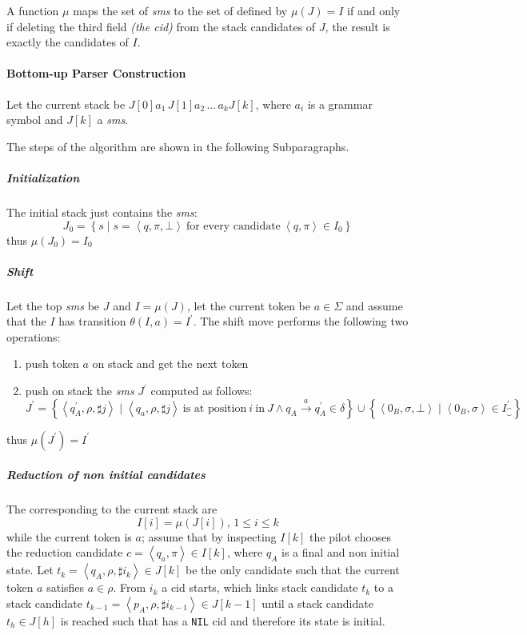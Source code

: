 \documentclass[english]{article}
\begin{document}
A function \(\mu\) maps the set of \textit{sms} to the set of \mstates defined by \(\mu(J) = I\) if and only if deleting the third field \textit{(the cid)} from the stack candidates of \(J\), the result is exactly the candidates of \(I\).

\paragraph{Bottom-up Parser Construction}
\label{par:parser-algorithm-bottom-up}

Let the current stack be \(J[0] a_1 \, J[1] a_2 \, \ldots \, a_k J[k]\), where \(a_i\) is a grammar symbol and \(J[k]\) a \textit{sms}.

The steps of the algorithm are shown in the following Subparagraphs.

\subparagraph*{Initialization}

The initial stack just contains the \textit{sms}:
\[ J_0 = \left\{ s \mid s = \left\langle q, \pi, \bot \right\rangle \ \text{for every candidate} \ \left\langle q, \pi \right\rangle \in I_0 \right\} \]
thus \(\mu(J_0) = I_0\)

\subparagraph*{Shift}

Let the top \textit{sms} be \(J\) and \(I = \mu(J)\), let the current token be \(a \in \Sigma\) and assume that the \mstate \(I\) has transition \(\theta(I, a) = I^\prime\). The shift move performs the following two operations:
\begin{enumerate}[label=\arabic*., ref=(\arabic*)]
  \item\label{enum:shift-move-1} push token \(a\) on stack and get the next token
  \item\label{enum:shift-move-2} push on stack the \textit{sms} \(J^\prime\) computed as follows:
  \[
    J^\prime  =  \left\{ \left\langle q_A^\prime, \rho, \sharp j \right\rangle \mid \left\langle q_a, \rho, \sharp j \right\rangle \ \text{is at position} \ i \ \text{in} \ J \land q_A \xrightarrow{a} q_A^\prime \in \delta \right\}
    \cup         \left\{ \left\langle 0_B, \sigma, \bot \right\rangle \mid \left\langle 0_B, \sigma  \right\rangle \in I_{\closure}^\prime \right\}
  \]
\end{enumerate}
thus \(\mu(J^\prime) = I^\prime\)

\subparagraph*{Reduction of non initial candidates}

The \mstates corresponding to the current stack are
\[ I[i] = \mu\left( J[i] \right), \, 1 \leq i \leq k \]
while the current token is \(a\);
assume that by inspecting \(I[k]\) the pilot chooses the reduction candidate \(c = \left\langle q_a, \pi \right\rangle \in I[k]\), where \(q_A\) is a final and non initial state.
Let \(t_k = \left\langle q_A, \rho, \sharp i_k \right\rangle \in J[k]\) be the only candidate such that the current token \(a\) satisfies \(a \in \rho\).
From \(i_k\) a cid starts, which links stack candidate \(t_k\) to a stack candidate \(t_{k-1} = \left\langle p_A, \rho, \sharp i_{k-1} \right\rangle \in J[k-1]\) until a stack candidate \(t_h \in J[h]\) is reached such that has a \texttt{NIL} cid and therefore its state is initial.
\end{document}
